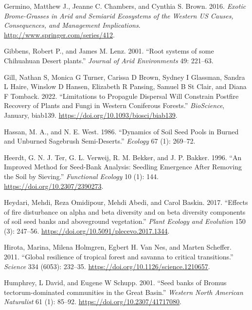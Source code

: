 \documentclass[
  12pt,
]{article}
\newlength{\cslhangindent}
\newlength{\cslentryspacingunit} %
\newenvironment{CSLReferences}[2] %
 {%
  \setlength{\parindent}{0pt}
  \ifodd #1
  \let\oldpar\par
  \def\par{\hangindent=\cslhangindent\oldpar}
  \fi
  \setlength{\parskip}{#2\cslentryspacingunit}
 }%
 {}
\begin{document}
\begin{CSLReferences}{1}{0}
\leavevmode{}%
Germino, Matthew J., Jeanne C. Chambers, and Cynthia S. Brown. 2016.
\emph{{Exotic Brome-Grasses in Arid and Semiarid Ecosystems of the
Western US Causes, Consequences, and Management Implications}}.
\url{http://www.springer.com/series/412}.

\leavevmode{}%
Gibbens, Robert P., and James M. Lenz. 2001. {``{Root systems of some
Chihuahuan Desert plants}.''} \emph{Journal of Arid Environments} 49:
221--63.

\leavevmode{}%
Gill, Nathan S, Monica G Turner, Carissa D Brown, Sydney I Glassman,
Sandra L Haire, Winslow D Hansen, Elizabeth R Pansing, Samuel B St
Clair, and Diana F Tomback. 2022. {``Limitations to {Propagule}
{Dispersal} {Will} {Constrain} {Postfire} {Recovery} of {Plants} and
{Fungi} in {Western} {Coniferous} {Forests}.''} \emph{BioScience},
January, biab139. \url{https://doi.org/10.1093/biosci/biab139}.

\leavevmode{}%
Hassan, M. A., and N. E. West. 1986. {``{Dynamics of Soil Seed Pools in
Burned and Unburned Sagebrush Semi-Deserts}.''} \emph{Ecology} 67 (1):
269--72.

\leavevmode{}%
Heerdt, G. N. J. Ter, G. L. Verweij, R. M. Bekker, and J. P. Bakker.
1996. {``{An Improved Method for Seed-Bank Analysis: Seedling Emergence
After Removing the Soil by Sieving}.''} \emph{Functional Ecology} 10
(1): 144. \url{https://doi.org/10.2307/2390273}.

\leavevmode{}%
Heydari, Mehdi, Reza Omidipour, Mehdi Abedi, and Carol Baskin. 2017.
{``{Effects of fire disturbance on alpha and beta diversity and on beta
diversity components of soil seed banks and aboveground vegetation}.''}
\emph{Plant Ecology and Evolution} 150 (3): 247--56.
\url{https://doi.org/10.5091/plecevo.2017.1344}.

\leavevmode{}%
Hirota, Marina, Milena Holmgren, Egbert H. Van Nes, and Marten Scheffer.
2011. {``{Global resilience of tropical forest and savanna to critical
transitions}.''} \emph{Science} 334 (6053): 232--35.
\url{https://doi.org/10.1126/science.1210657}.

\leavevmode{}%
Humphrey, L David, and Eugene W Schupp. 2001. {``{Seed banks of Bromus
tectorum-dominated communities in the Great Basin}.''} \emph{Western
North American Naturalist} 61 (1): 85--92.
\url{https://doi.org/10.2307/41717080}.


\end{CSLReferences}
\end{document}

